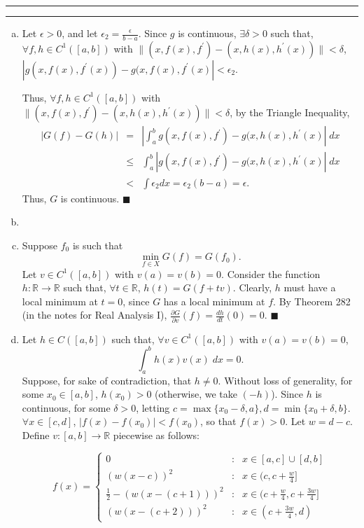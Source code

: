 \documentclass[11pt]{article}
\newcounter{questionCounter}
\newcounter{partCounter}[questionCounter]
\newenvironment{question}[2][\arabic{questionCounter}]{%
    \setcounter{partCounter}{0}%
    \vspace{.25in} \hrule \vspace{0.5em}%
        \noindent{\bf #2}%
    \vspace{0.8em} \hrule \vspace{.10in}%
    \addtocounter{questionCounter}{1}%
}{}
\begin{document}
\begin{question}{Problem 3}
\begin{enumerate}[(a)]
\item Let $\epsilon > 0$, and let $\epsilon_2 = \frac{\epsilon}{b - a}$. Since
$g$ is continuous, $\exists \delta > 0$ such that,
$\forall f,h \in C^1([a,b])$ with
$\|(x,f(x),f^{\prime}) - (x,h(x),h^{\prime}(x))\| < \delta$,
$|g(x,f(x),f^{\prime}(x)) - g(x,f(x),f^{\prime}(x)| < \epsilon_2$.

Thus, $\forall f, h \in C^1([a,b])$ with
$\|(x,f(x),f^{\prime}) - (x,h(x),h^{\prime}(x))\| < \delta$, by the Triangle
Inequality,
\begin{eqnarray*}
|G(f) - G(h)|
 & = & \left|\int_a^b g(x,f(x),f^{\prime}) - g(x,h(x),h^{\prime}(x)\right| \; dx \\
 & \leq & \int_a^b \left|g(x,f(x),f^{\prime}) - g(x,h(x),h^{\prime}(x)\right| \; dx \\
 & < & \int \epsilon_2 dx = \epsilon_2(b - a) = \epsilon.
\end{eqnarray*}
Thus, $G$ is continuous. \qquad $\blacksquare$

\item

\item Suppose $f_0$ is such that \[\min_{f \in X} G(f) = G(f_0).\]
Let $v \in C^1([a,b])$ with $v(a) = v(b) = 0$. Consider the function
$h : \mathbb{R} \rightarrow \mathbb{R}$ such that, $\forall t \in \mathbb{R}$,
$h(t) = G(f + tv)$. Clearly, $h$ must have a local minimum at $t = 0$, since
$G$ has a local minimum at $f$. By Theorem 282 (in the notes for Real Analysis
I), $\frac{\partial G}{\partial v} (f) = \frac{dh}{dt} (0) = 0$.
\qquad $\blacksquare$

\item Let $h \in C([a,b])$ such that, $\forall v \in C^1([a,b])$ with
$v(a) = v(b) = 0$, \[\int_a^b h(x) v(x) \; dx = 0.\] Suppose, for sake of
contradiction, that $h \neq 0$. Without loss of generality, for some
$x_0 \in [a,b]$, $h(x_0) > 0$ (otherwise, we take $(-h)$). Since $h$ is
continuous, for some $\delta > 0$, letting
$c = \max \{x_0 - \delta, a\}, d = \min \{x_0 + \delta, b\}$.
$\forall x \in [c,d]$, $|f(x) - f(x_0)| < f(x_0)$, so that $f(x) > 0$.
Let $w = d - c$.
Define $v: [a,b] \rightarrow \mathbb{R}$ piecewise as follows:

\[
   f(x) = \left\{
     \begin{array}{lcr}
       0 & : & x \in [a,c] \cup [d,b] \\
       (w(x - c))^2  & : & x \in (c,c + \frac{w}{4}] \\
       \frac{1}{2} - (w(x - (c + 1)))^2  &
                         : & x \in (c + \frac{w}{4},c + \frac{3w}{4}] \\
       (w(x - (c + 2)))^2  & : & x \in (c + \frac{3w}{4}, d)
       

\end{array}\]
\end{enumerate}
\end{question}
\end{document}
